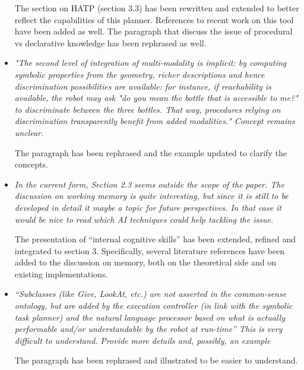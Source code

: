 \documentclass{article}
\begin{document}
\begin{itemize}
            The section on HATP (section 3.3) has been rewritten and extended to
            better reflect the capabilities of this planner. References to
            recent work on this tool have been added as well.  The paragraph
            that discuss the issue of procedural vs declarative knowledge has
            been rephrased as well.


    \item \emph{"The second level of integration of multi-modality is implicit:
            by computing symbolic properties 
            from the geometry, richer descriptions and hence discrimination
            possibilities are available: 
            for instance, if reachability is available, the robot may ask "do
            you mean the bottle that is 
            accessible to me?" to discriminate between the three bottles. That
            way, procedures relying on 
            discrimination transparently benefit from added modalities." Concept
            remains unclear.}
            
            The paragraph has been rephrased and the example
            updated to clarify the concepts.

    \item \emph{In the current form, Section 2.3 seems outside the scope of the
            paper. The discussion on working memory is quite interesting, but
            since it is still to be developed in detail it maybe a topic for
            future perspectives. In that case it would be nice to read which AI
            techniques could help tackling the issue.}
            
            The presentation of
            ``internal cognitive skills'' has been extended, refined and integrated
            to section 3. Specifically, several literature references have been
            added to the discussion on memory, both on the theoretical side and on
            existing implementations.

    \item \emph{``Subclasses (like Give, LookAt, etc.) are not asserted in the
            common-sense ontology, but are added by the execution controller (in
            link with the symbolic task planner) and the natural language
            processor based on what is actually performable and/or
            understandable by the robot at run-time'' This is very difficult to
            understand. Provide more details and, possibly, an example}
            
            The paragraph
            has been rephrased and illustrated to be easier to understand.

\end{itemize}
\end{document}
